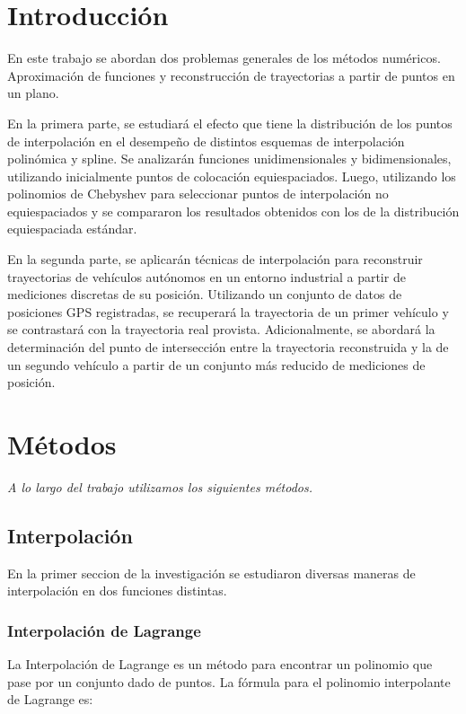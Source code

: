 \documentclass[12pt,a4]{article} %
\begin{document}
\begin{multicols}{2}
\raggedcolumns

\section{Introducción}
En este trabajo se abordan dos problemas generales de los métodos numéricos. Aproximación de funciones y reconstrucción de trayectorias a partir de puntos en un plano.

En la primera parte, se estudiará el efecto que tiene la distribución de los puntos de interpolación en el desempeño de distintos esquemas de interpolación polinómica y spline. Se analizarán funciones unidimensionales y bidimensionales, utilizando inicialmente puntos de colocación equiespaciados. Luego, utilizando los polinomios de Chebyshev para seleccionar puntos de interpolación no equiespaciados y se compararon los resultados obtenidos con los de la distribución equiespaciada estándar.

En la segunda parte, se aplicarán técnicas de interpolación para reconstruir trayectorias de vehículos autónomos en un entorno industrial a partir de mediciones discretas de su posición. Utilizando un conjunto de datos de posiciones GPS registradas, se recuperará la trayectoria de un primer vehículo y se contrastará con la trayectoria real provista. Adicionalmente, se abordará la determinación del punto de intersección entre la trayectoria reconstruida y la de un segundo vehículo a partir de un conjunto más reducido de mediciones de posición.



\section{Métodos}

\textit{A lo largo del trabajo utilizamos los siguientes métodos. }

\subsection{Interpolación}

En la primer seccion de la investigación se estudiaron diversas maneras de interpolación en dos funciones distintas.
\subsubsection{Interpolación de Lagrange}
La Interpolación de Lagrange es un método para encontrar un polinomio que pase por un conjunto dado de puntos. La fórmula para el polinomio interpolante de Lagrange es:


\end{multicols}
\end{document}
